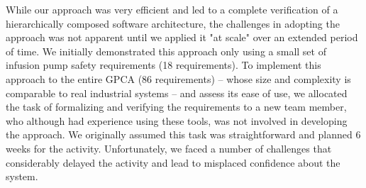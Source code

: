While our approach was very efficient and led to a complete verification of a hierarchically composed software architecture, the challenges in adopting the approach was not apparent until we applied it "at scale" over an extended period of time. We initially demonstrated this approach only using a small set of infusion pump safety requirements (18 requirements). To implement this approach to the entire GPCA (86 requirements) -- whose size and complexity is comparable to real industrial systems -- and assess its ease of use, we allocated the task of formalizing and verifying the requirements to a new team member, who although had experience using these tools, was not involved in developing the approach. We originally assumed this task was straightforward and planned 6 weeks for the activity. Unfortunately, we faced a number of challenges that considerably delayed the activity and lead to misplaced confidence about the system.


%


